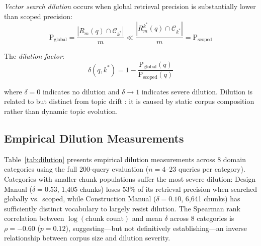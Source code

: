 \documentclass{article}
\newcommand{\numQueries}{200}
\begin{document}
\textit{Vector search dilution} occurs when global retrieval precision is substantially lower than scoped precision:
\begin{equation}
\text{P}_{\text{global}} = \frac{|R_m(q) \cap \mathcal{C}_{k^*}|}{m} \ll \frac{|R_m^{k^*}(q) \cap \mathcal{C}_{k^*}|}{m} = \text{P}_{\text{scoped}}
\end{equation}

The \textit{dilution factor}:
\begin{equation}
\delta(q, k^*) = 1 - \frac{\text{P}_{\text{global}}(q)}{\text{P}_{\text{scoped}}(q)}
\label{eq:dilution}
\end{equation}

where $\delta = 0$ indicates no dilution and $\delta \rightarrow 1$ indicates severe dilution. Dilution is related to but distinct from topic drift \cite{allan2002tdt}: it is caused by static corpus composition rather than dynamic topic evolution.

\subsection{Empirical Dilution Measurements}

Table~\ref{tab:dilution} presents empirical dilution measurements across 8 domain categories using the full \numQueries{}-query evaluation ($n = 4$--$23$ queries per category). Categories with smaller chunk populations suffer the most severe dilution: Design Manual ($\delta = 0.53$, 1,405 chunks) loses 53\% of its retrieval precision when searched globally vs.\ scoped, while Construction Manual ($\delta = 0.10$, 6,641 chunks) has sufficiently distinct vocabulary to largely resist dilution. The Spearman rank correlation between $\log(\text{chunk count})$ and mean $\delta$ across 8 categories is $\rho = -0.60$ ($p = 0.12$), suggesting---but not definitively establishing---an inverse relationship between corpus size and dilution severity.
\end{document}
